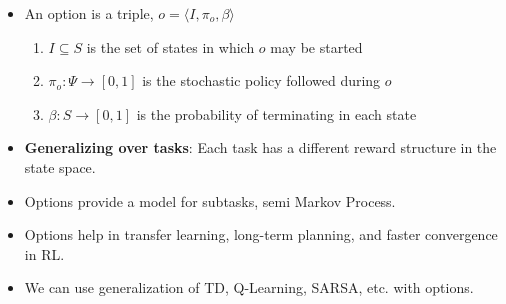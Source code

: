 \documentclass[a4paper]{article}
\begin{document}
\begin{itemize}
    \item An option is a triple, $o=\langle I,\pi_o,\beta \rangle$
    \begin{enumerate}
        \item $I\subseteq S$ is the set of states in which $o$ may be started
        \item $\pi_o:\Psi \to[0,1]$ is the stochastic policy followed during $o$
        \item $\beta:S\to [0,1]$ is the probability of terminating in each state
    \end{enumerate}
    \item \textbf{Generalizing over tasks}: Each task has a different reward structure in the state space.
    \item Options provide a model for subtasks, semi Markov Process.
    \item Options help in transfer learning, long-term planning, and faster convergence in RL.
    \item We can use generalization of TD, Q-Learning, SARSA, etc. with options.
\end{itemize}
\end{document}
